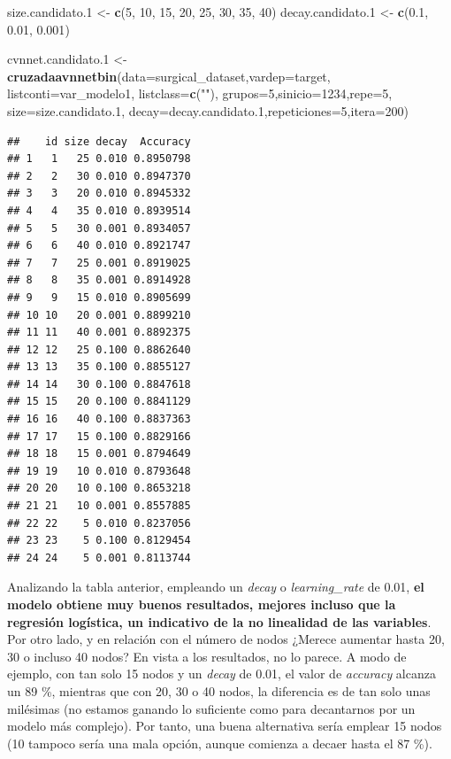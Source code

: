 \documentclass[
]{article}
\newenvironment{Shaded}{\begin{snugshade}}{\end{snugshade}}
\newcommand{\DataTypeTok}[1]{\textcolor[rgb]{0.13,0.29,0.53}{#1}}
\newcommand{\DecValTok}[1]{\textcolor[rgb]{0.00,0.00,0.81}{#1}}
\newcommand{\FloatTok}[1]{\textcolor[rgb]{0.00,0.00,0.81}{#1}}
\newcommand{\KeywordTok}[1]{\textcolor[rgb]{0.13,0.29,0.53}{\textbf{#1}}}
\newcommand{\NormalTok}[1]{#1}
\newcommand{\StringTok}[1]{\textcolor[rgb]{0.31,0.60,0.02}{#1}}
\begin{document}
\begin{Shaded}
\begin{Highlighting}[]
\NormalTok{size.candidato}\FloatTok{.1}\NormalTok{ <{-}}\StringTok{ }\KeywordTok{c}\NormalTok{(}\DecValTok{5}\NormalTok{, }\DecValTok{10}\NormalTok{, }\DecValTok{15}\NormalTok{, }\DecValTok{20}\NormalTok{, }\DecValTok{25}\NormalTok{, }\DecValTok{30}\NormalTok{, }\DecValTok{35}\NormalTok{, }\DecValTok{40}\NormalTok{)}
\NormalTok{decay.candidato}\FloatTok{.1}\NormalTok{ <{-}}\StringTok{ }\KeywordTok{c}\NormalTok{(}\FloatTok{0.1}\NormalTok{, }\FloatTok{0.01}\NormalTok{, }\FloatTok{0.001}\NormalTok{)}

\NormalTok{cvnnet.candidato}\FloatTok{.1}\NormalTok{ <{-}}\StringTok{ }\KeywordTok{cruzadaavnnetbin}\NormalTok{(}\DataTypeTok{data=}\NormalTok{surgical\_dataset,}\DataTypeTok{vardep=}\NormalTok{target,}
                                       \DataTypeTok{listconti=}\NormalTok{var\_modelo1, }\DataTypeTok{listclass=}\KeywordTok{c}\NormalTok{(}\StringTok{""}\NormalTok{),}
                                       \DataTypeTok{grupos=}\DecValTok{5}\NormalTok{,}\DataTypeTok{sinicio=}\DecValTok{1234}\NormalTok{,}\DataTypeTok{repe=}\DecValTok{5}\NormalTok{, }\DataTypeTok{size=}\NormalTok{size.candidato}\FloatTok{.1}\NormalTok{,}
                                       \DataTypeTok{decay=}\NormalTok{decay.candidato}\FloatTok{.1}\NormalTok{,}\DataTypeTok{repeticiones=}\DecValTok{5}\NormalTok{,}\DataTypeTok{itera=}\DecValTok{200}\NormalTok{)}
\end{Highlighting}
\end{Shaded}

\begin{verbatim}
##    id size decay  Accuracy
## 1   1   25 0.010 0.8950798
## 2   2   30 0.010 0.8947370
## 3   3   20 0.010 0.8945332
## 4   4   35 0.010 0.8939514
## 5   5   30 0.001 0.8934057
## 6   6   40 0.010 0.8921747
## 7   7   25 0.001 0.8919025
## 8   8   35 0.001 0.8914928
## 9   9   15 0.010 0.8905699
## 10 10   20 0.001 0.8899210
## 11 11   40 0.001 0.8892375
## 12 12   25 0.100 0.8862640
## 13 13   35 0.100 0.8855127
## 14 14   30 0.100 0.8847618
## 15 15   20 0.100 0.8841129
## 16 16   40 0.100 0.8837363
## 17 17   15 0.100 0.8829166
## 18 18   15 0.001 0.8794649
## 19 19   10 0.010 0.8793648
## 20 20   10 0.100 0.8653218
## 21 21   10 0.001 0.8557885
## 22 22    5 0.010 0.8237056
## 23 23    5 0.100 0.8129454
## 24 24    5 0.001 0.8113744
\end{verbatim}

Analizando la tabla anterior, empleando un \emph{decay} o
\emph{learning\_rate} de 0.01, \textbf{el modelo obtiene muy buenos
resultados, mejores incluso que la regresión logística, un indicativo de
la no linealidad de las variables}. Por otro lado, y en relación con el
número de nodos ¿Merece aumentar hasta 20, 30 o incluso 40 nodos? En
vista a los resultados, no lo parece. A modo de ejemplo, con tan solo 15
nodos y un \emph{decay} de 0.01, el valor de \emph{accuracy} alcanza un
89 \%, mientras que con 20, 30 o 40 nodos, la diferencia es de tan solo
unas milésimas (no estamos ganando lo suficiente como para decantarnos
por un modelo más complejo). Por tanto, una buena alternativa sería
emplear 15 nodos (10 tampoco sería una mala opción, aunque comienza a
decaer hasta el 87 \%).
\end{document}
